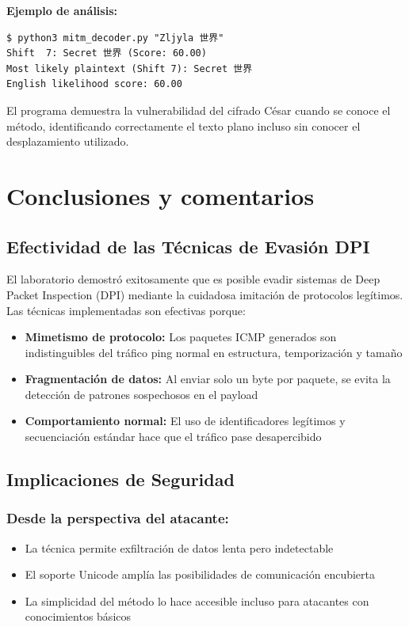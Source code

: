 \documentclass[letter,12pt]{article}
\begin{document}
\textbf{Ejemplo de análisis:}
\begin{verbatim}
$ python3 mitm_decoder.py "Zljyla 世界"
Shift  7: Secret 世界 (Score: 60.00)
Most likely plaintext (Shift 7): Secret 世界
English likelihood score: 60.00
\end{verbatim}

El programa demuestra la vulnerabilidad del cifrado César cuando se conoce el método, identificando correctamente el texto plano incluso sin conocer el desplazamiento utilizado.



\section*{Conclusiones y comentarios}

\subsection*{Efectividad de las Técnicas de Evasión DPI}

El laboratorio demostró exitosamente que es posible evadir sistemas de Deep Packet Inspection (DPI) mediante la cuidadosa imitación de protocolos legítimos. Las técnicas implementadas son efectivas porque:

\begin{itemize}
    \item \textbf{Mimetismo de protocolo:} Los paquetes ICMP generados son indistinguibles del tráfico ping normal en estructura, temporización y tamaño
    
    \item \textbf{Fragmentación de datos:} Al enviar solo un byte por paquete, se evita la detección de patrones sospechosos en el payload
    
    \item \textbf{Comportamiento normal:} El uso de identificadores legítimos y secuenciación estándar hace que el tráfico pase desapercibido
\end{itemize}

\subsection*{Implicaciones de Seguridad}

\subsubsection*{Desde la perspectiva del atacante:}
\begin{itemize}
    \item La técnica permite exfiltración de datos lenta pero indetectable
    
    \item El soporte Unicode amplía las posibilidades de comunicación encubierta
    
    \item La simplicidad del método lo hace accesible incluso para atacantes con conocimientos básicos
\end{itemize}
\end{document}
